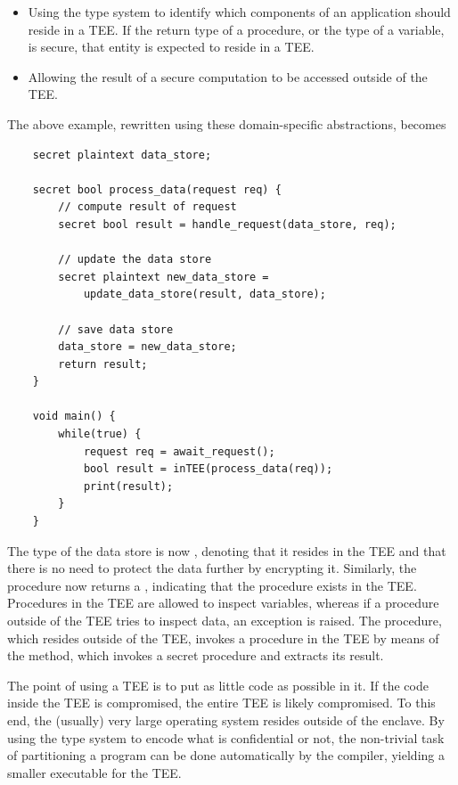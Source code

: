 \begin{itemize}
    \item Using the type system to identify which components of an application should reside in a TEE. If the return type of a
    procedure, or the type of a variable, is secure, that entity is expected to reside in a TEE.
    \item Allowing the result of a secure computation to be accessed outside of the TEE.
\end{itemize}

The above example, rewritten using these domain-specific abstractions, becomes

\begin{verbatim}
    secret plaintext data_store;

    secret bool process_data(request req) {
        // compute result of request
        secret bool result = handle_request(data_store, req);

        // update the data store
        secret plaintext new_data_store =
            update_data_store(result, data_store);

        // save data store
        data_store = new_data_store;
        return result;
    }

    void main() {
        while(true) {
            request req = await_request();
            bool result = inTEE(process_data(req));
            print(result);
        }
    }
\end{verbatim}

The type of the data store is now , denoting that it resides in the TEE and that there is no need to
protect the data further by encrypting it. Similarly, the procedure  now returns a , indicating
that the procedure exists in the TEE. Procedures in the TEE are allowed to inspect  variables, whereas if a procedure
outside of the TEE tries to inspect  data, an exception is raised.
The  procedure, which resides outside of the TEE, invokes a procedure in the TEE by means of the  method,
which invokes a secret procedure and extracts its result.

The point of using a TEE is to put as little code as possible in it. If the code inside the TEE is compromised, the entire TEE is
likely compromised. To this end, the (usually) very large operating system resides outside of the enclave. By using the type
system to encode what is confidential or not, the non-trivial task of partitioning a program can be done automatically by the
compiler, yielding a smaller executable for the TEE.

